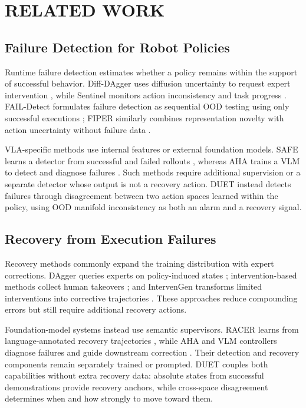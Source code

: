 \documentclass[letterpaper, 10 pt, conference]{ieeeconf}
\begin{document}
\section{RELATED WORK}

\subsection{Failure Detection for Robot Policies}
Runtime failure detection estimates whether a policy remains within the support of successful behavior. Diff-DAgger uses diffusion uncertainty to request expert intervention \cite{diffdagger}, while Sentinel monitors action inconsistency and task progress \cite{sentinel}. FAIL-Detect formulates failure detection as sequential OOD testing using only successful executions \cite{faildetect}; FIPER similarly combines representation novelty with action uncertainty without failure data \cite{fiper}.

VLA-specific methods use internal features or external foundation models. SAFE learns a detector from successful and failed rollouts \cite{safe}, whereas AHA trains a VLM to detect and diagnose failures \cite{aha}. Such methods require additional supervision or a separate detector whose output is not a recovery action. DUET instead detects failures through disagreement between two action spaces learned within the policy, using OOD manifold inconsistency as both an alarm and a recovery signal.

\subsection{Recovery from Execution Failures}
Recovery methods commonly expand the training distribution with expert corrections. DAgger queries experts on policy-induced states \cite{dagger}; intervention-based methods collect human takeovers \cite{eil,sirius}; and IntervenGen transforms limited interventions into corrective trajectories \cite{intervengen}. These approaches reduce compounding errors but still require additional recovery actions.

Foundation-model systems instead use semantic supervisors. RACER learns from language-annotated recovery trajectories \cite{racer}, while AHA and VLM controllers diagnose failures and guide downstream correction \cite{aha,vlmrecovery}. Their detection and recovery components remain separately trained or prompted. DUET couples both capabilities without extra recovery data: absolute states from successful demonstrations provide recovery anchors, while cross-space disagreement determines when and how strongly to move toward them.
\end{document}
